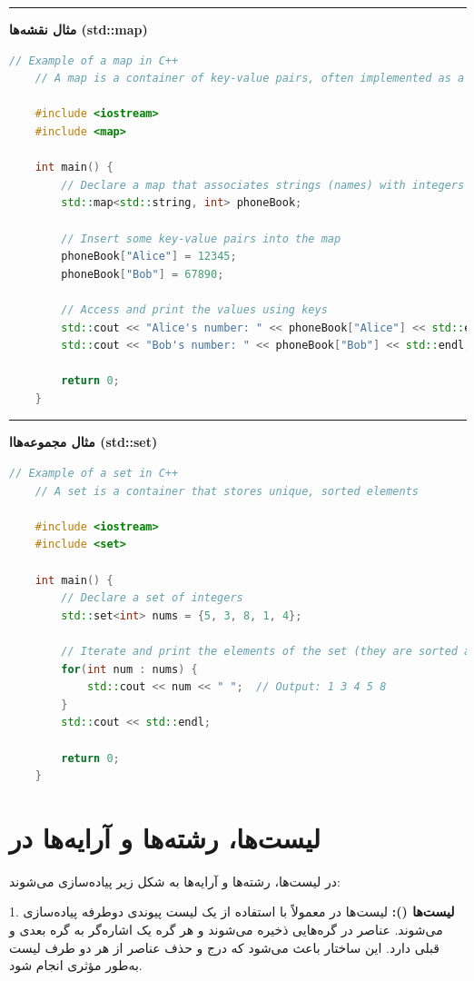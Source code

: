 \documentclass[12pt, a4paper]{report}
\begin{document}
\noindent\rule{\linewidth}{0.4pt} %

\textbf{مثال نقشه‌ها (std::map)} \\
\LTR
\begin{lstlisting}[language=C++, breaklines=true]
	// Example of a map in C++
	// A map is a container of key-value pairs, often implemented as a balanced binary tree
	
	#include <iostream>
	#include <map>
	
	int main() {
		// Declare a map that associates strings (names) with integers (phone numbers)
		std::map<std::string, int> phoneBook;
		
		// Insert some key-value pairs into the map
		phoneBook["Alice"] = 12345;
		phoneBook["Bob"] = 67890;
		
		// Access and print the values using keys
		std::cout << "Alice's number: " << phoneBook["Alice"] << std::endl; // Output: Alice's number: 12345
		std::cout << "Bob's number: " << phoneBook["Bob"] << std::endl; // Output: Bob's number: 67890
		
		return 0;
	}
\end{lstlisting}
\RTL

\noindent\rule{\linewidth}{0.4pt} %

\textbf{مثال مجموعه‌هاا (std::set)} \\
\LTR
\begin{lstlisting}[language=C++, breaklines=true]
	// Example of a set in C++
	// A set is a container that stores unique, sorted elements
	
	#include <iostream>
	#include <set>
	
	int main() {
		// Declare a set of integers
		std::set<int> nums = {5, 3, 8, 1, 4};
		
		// Iterate and print the elements of the set (they are sorted automatically)
		for(int num : nums) {
			std::cout << num << " ";  // Output: 1 3 4 5 8
		}
		std::cout << std::endl;
		
		return 0;
	}
\end{lstlisting}
\RTL
\pagebreak
\section{لیست‌ها، رشته‌ها و آرایه‌ها در }


در  لیست‌ها، رشته‌ها و آرایه‌ها به شکل زیر پیاده‌سازی می‌شوند:


1. \textbf{لیست‌ها ():} 
لیست‌ها در  معمولاً با استفاده از یک لیست پیوندی دوطرفه پیاده‌سازی می‌شوند. عناصر در گره‌هایی ذخیره می‌شوند و هر گره یک اشاره‌گر به گره بعدی و قبلی دارد. این ساختار باعث می‌شود که درج و حذف عناصر از هر دو طرف لیست به‌طور مؤثری انجام شود.
\end{document}
